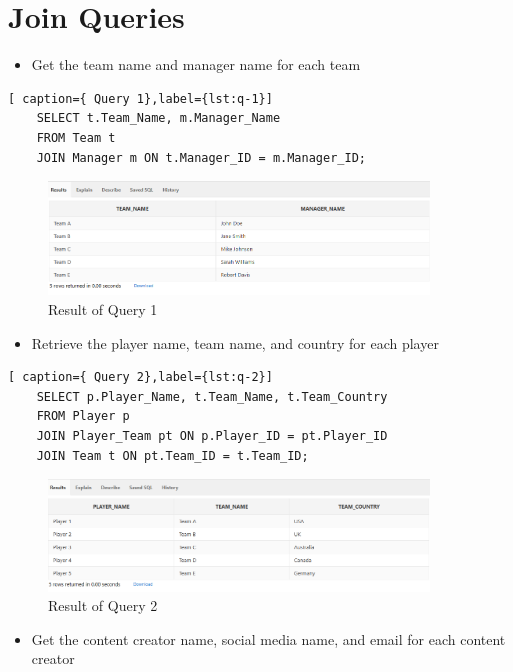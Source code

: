 \section{Join Queries}
\hrulefill

\begin{itemize}
    \item Get the team name and manager name for each team
\end{itemize}

\begin{lstlisting}[ caption={ Query 1},label={lst:q-1}]
    SELECT t.Team_Name, m.Manager_Name
    FROM Team t
    JOIN Manager m ON t.Manager_ID = m.Manager_ID;
\end{lstlisting}
\begin{figure}[H]
    \centering
    \includegraphics[width=0.9\textwidth]{images/dml/Joinq/q1.png}
    \caption{Result of Query 1}
\end{figure}
\begin{itemize}
    \item Retrieve the player name, team name, and country for each player
\end{itemize}
\begin{lstlisting}[ caption={ Query 2},label={lst:q-2}]
    SELECT p.Player_Name, t.Team_Name, t.Team_Country
    FROM Player p
    JOIN Player_Team pt ON p.Player_ID = pt.Player_ID
    JOIN Team t ON pt.Team_ID = t.Team_ID;
\end{lstlisting}
\begin{figure}[H]
    \centering
    \includegraphics[width=0.9\textwidth]{images/dml/Joinq/q2.png}
    \caption{Result of Query 2}
\end{figure}
\clearpage
\begin{itemize}
    \item Get the content creator name, social media name, and email for each content creator
\end{itemize}

